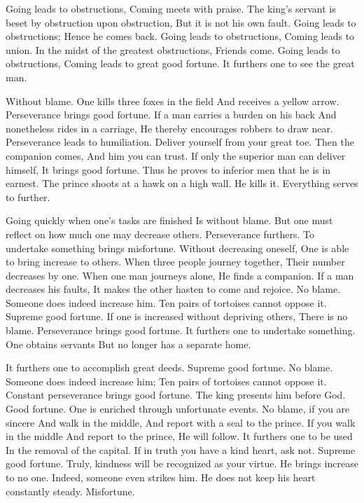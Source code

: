 {Going leads to obstructions,
 Coming meets with praise.}
{The king’s servant is beset by obstruction upon obstruction,
 But it is not his own fault.}
{Going leads to obstructions;
 Hence he comes back.}
{Going leads to obstructions,
 Coming leads to union.}
{In the midst of the greatest obstructions,
 Friends come.}
{Going leads to obstructions,
 Coming leads to great good fortune.
 It furthers one to see the great man.}

{Without blame.}
{One kills three foxes in the field
 And receives a yellow arrow.
 Perseverance brings good fortune.}
{If a man carries a burden on his back
 And nonetheless rides in a carriage,
 He thereby encourages robbers to draw near.
 Perseverance leads to humiliation.}
{Deliver yourself from your great toe.
 Then the companion comes,
 And him you can trust.}
{If only the superior man can deliver himself,
 It brings good fortune.
 Thus he proves to inferior men that he is in earnest.}
{The prince shoots at a hawk on a high wall.
 He kills it. Everything serves to further.}

{Going quickly when one’s tasks are finished
 Is without blame.
 But one must reflect on how much one may decrease others.}
{Perseverance furthers.
 To undertake something brings misfortune.
 Without decreasing oneself,
 One is able to bring increase to others.}
{When three people journey together,
 Their number decreases by one.
 When one man journeys alone,
 He finds a companion.}
{If a man decreases his faults,
 It makes the other hasten to come and rejoice.
 No blame.}
{Someone does indeed increase him.
 Ten pairs of tortoises cannot oppose it.
 Supreme good fortune.}
{If one is increased without depriving others,
 There is no blame.
 Perseverance brings good fortune.
 It furthers one to undertake something.
 One obtains servants
 But no longer has a separate home.}

{It furthers one to accomplish great deeds.
 Supreme good fortune. No blame.}
{Someone does indeed increase him;
 Ten pairs of tortoises cannot oppose it.
 Constant perseverance brings good fortune.
 The king presents him before God.
 Good fortune.}
{One is enriched through unfortunate events.
 No blame, if you are sincere
 And walk in the middle,
 And report with a seal to the prince.}
{If you walk in the middle
 And report to the prince,
 He will follow.
 It furthers one to be used
 In the removal of the capital.}
{If in truth you have a kind heart, ask not.
 Supreme good fortune.
 Truly, kindness will be recognized as your virtue.}
{He brings increase to no one.
 Indeed, someone even strikes him.
 He does not keep his heart constantly steady.
 Misfortune.}

